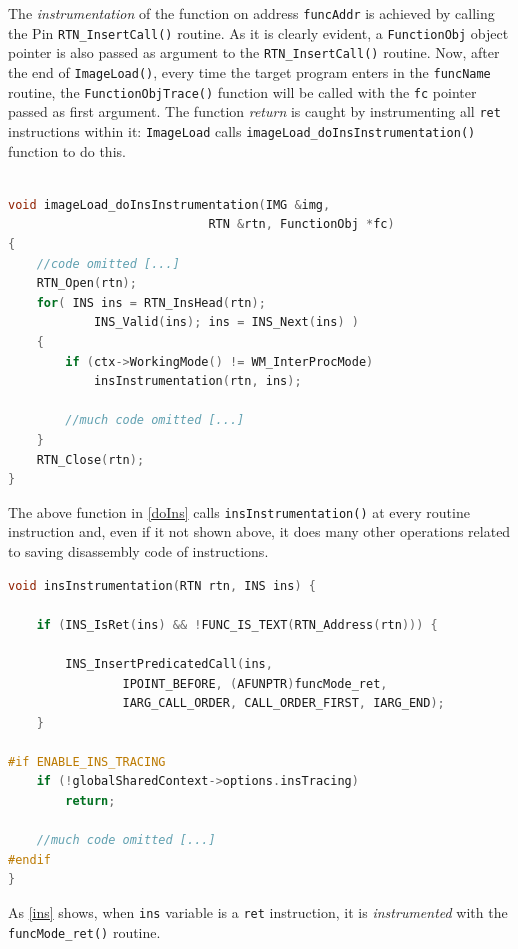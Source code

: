 \documentclass[a4paper,10pt]{report}
\begin{document}
\noindent
The \emph{instrumentation} of the function on address \verb|funcAddr| is achieved 
by calling the Pin \verb|RTN_InsertCall()| routine. 
As it is clearly evident, a \verb|FunctionObj| object pointer is also passed as
argument to the \verb|RTN_InsertCall()| routine. 
Now, after the end of \verb|ImageLoad()|, every time the target program
enters in the \verb|funcName| routine, the \verb|FunctionObjTrace()| function 
will be called with the \verb|fc| pointer passed as first argument.
The function \emph{return} is caught by instrumenting all \verb|ret| instructions
within it: \verb|ImageLoad| calls \verb|imageLoad_doInsInstrumentation()| function
to do this. 

\begin{lstlisting}[language=C++, 
	caption={a fragment of \texttt{imageLoad\_doInsInstrumentation()} routine}, 
	label=doIns, frame=leftline]	

void imageLoad_doInsInstrumentation(IMG &img, 
							RTN &rtn, FunctionObj *fc) 
{
	//code omitted [...]
	RTN_Open(rtn);
	for( INS ins = RTN_InsHead(rtn); 
			INS_Valid(ins); ins = INS_Next(ins) ) 
	{
		if (ctx->WorkingMode() != WM_InterProcMode)
			insInstrumentation(rtn, ins);	

		//much code omitted [...]		
	}
	RTN_Close(rtn);
}
\end{lstlisting}

\noindent
The above function in \cref{doIns} calls \verb|insInstrumentation()| at every routine instruction and, even if it not shown above, it does many other operations 
related to saving disassembly code of instructions.

\begin{lstlisting}[language=C++, 
	caption={a fragment of \texttt{insInstrumentation()} routine}, 
	label=ins, frame=leftline]
void insInstrumentation(RTN rtn, INS ins) {

	if (INS_IsRet(ins) && !FUNC_IS_TEXT(RTN_Address(rtn))) {

		INS_InsertPredicatedCall(ins, 
				IPOINT_BEFORE, (AFUNPTR)funcMode_ret, 
				IARG_CALL_ORDER, CALL_ORDER_FIRST, IARG_END);
	}

#if ENABLE_INS_TRACING
	if (!globalSharedContext->options.insTracing)
		return;
	
	//much code omitted [...]	
#endif
}

\end{lstlisting}

\noindent
As \cref{ins} shows, when \verb|ins| variable is a \verb|ret| instruction,  
it is \emph{instrumented} with the \verb|funcMode_ret()| routine.
\end{document}

